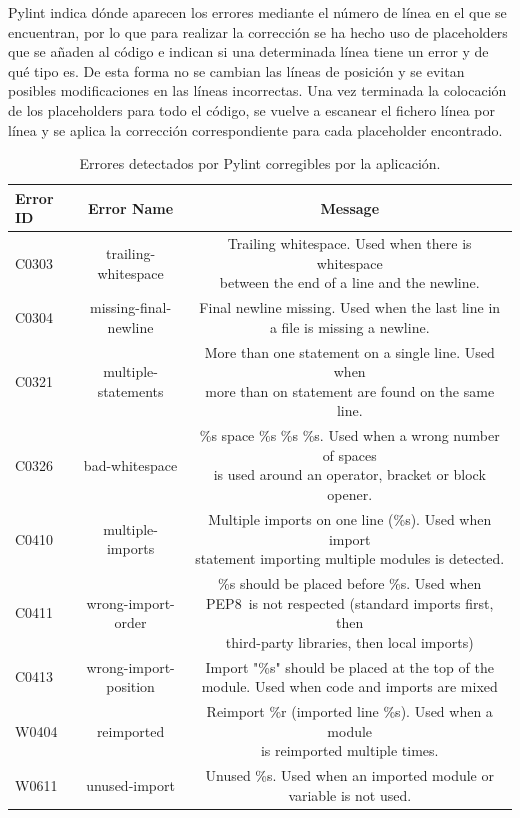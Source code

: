 \documentclass[a4paper, 12pt]{book}
\begin{document}
Pylint indica dónde aparecen los errores mediante el número de línea en el que se encuentran, por lo que para realizar la corrección se ha hecho uso de placeholders que se añaden al código e indican si una determinada línea tiene un error y de qué tipo es.
De esta forma no se cambian las líneas de posición y se evitan posibles modificaciones en las líneas incorrectas.
Una vez terminada la colocación de los placeholders para todo el código, se vuelve a escanear el fichero línea por línea y se aplica la corrección correspondiente para cada placeholder encontrado.
\begin{table}
 \begin{center}
  \begin{tabular}{ | l | c | c |}
    \hline
    \textbf{Error ID} & \textbf{Error Name} & \textbf{Message} \\ \hline
    C0303 & trailing-whitespace & \makecell[l]{Trailing whitespace. Used when there is whitespace\\between the end of a line and the newline.} \\ \hline
    C0304 & missing-final-newline & \makecell[l]{Final newline missing. Used when the last line in\\a file is missing a newline.} \\ \hline
    C0321 & multiple-statements & \makecell[l]{More than one statement on a single line. Used when\\more than on statement are found on the same line.} \\ \hline
    C0326 & bad-whitespace & \makecell[l]{\%s space \%s \%s \%s. Used when a wrong number of spaces\\is used around an operator, bracket or block opener.} \\ \hline
    C0410 & multiple-imports & \makecell[l]{Multiple imports on one line (\%s). Used when import\\statement importing multiple modules is detected.} \\ \hline
    C0411 & wrong-import-order & \makecell[l]{\%s should be placed before \%s. Used when PEP8\ is not respected (standard imports first, then\\third-party libraries, then local imports)} \\ \hline
    C0413 & wrong-import-position & \makecell[l]{Import "\%s" should be placed at the top of the\\module. Used when code and imports are mixed} \\ \hline
    W0404 & reimported & \makecell[l]{Reimport \%r (imported line \%s). Used when a module\\is reimported multiple times.} \\ \hline
    W0611 & unused-import & \makecell[l]{Unused \%s. Used when an imported module or\\variable is not used.} \\ \hline
  \end{tabular}
  \label{tabla:errores}
  \caption{Errores detectados por Pylint corregibles por la aplicación.}
 \end{center}
\end{table}
\end{document}
